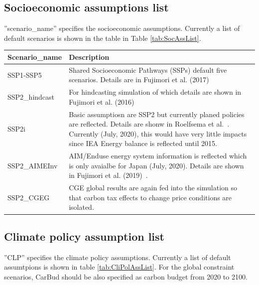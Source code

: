 \documentclass[10pt,a4paper,titlepage,dvipdfmx]{book}
\begin{document}
\subsection{\label{subsec:SocAssLis}Socioeconomic assumptions list}

''scenario\_name'' specifies the socioeconomic assumptions. Currently a list of default scenarios is shown in the table in Table \ref{tab:SocAssList}.


\begin{tabularx}{\textwidth}{|
p{}|
p{}|} 
\caption{\label{tab:SocAssList} Socioeconomic assumptions list} \\
\hline 
Scenario\_name & Description \\\hline 
SSP1-SSP5 & Shared Socioeconomic Pathways (SSPs) default five scenarios. Details are in Fujimori et al. (2017)~\cite{RN4363} \\\hline 
SSP2\_hindcast & For hindcasting simulation of which details are shown in Fujimori et al. (2016)~\cite{RN4011} \\\hline 
SSP2i & Basic assumptiosn are SSP2 but currently planed policies are reflected. Details are shonw in Roelfsema et al.~\cite{RN4407}. Currently (July, 2020), this would have very little impacts since IEA Energy balance is reflected until 2015.  \\\hline 
SSP2\_AIMEInv & AIM/Enduse energy system information is reflected which is only avaialbe for Japan (July, 2020). Details are shown in Fujimori et al. (2019)~\cite{RN4425}. \\\hline 
SSP2\_CGEG & CGE global results are again fed into the simulation so that carbon tax effects to change price conditions are isolated. \\\hline 
\end{tabularx}
\subsection{\label{subsec:CliPolAssLis}Climate policy assumption list}

''CLP'' specifies the climate policy assumptions. Currently a list of default assumtpions is shown in table \ref{tab:CliPolAssList}. 
For the global constraint scenarios, CarBud should be also specified as carbon budget from 2020 to 2100.
\end{document}

